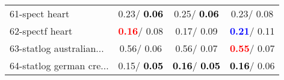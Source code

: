 \begin{table}[h]
\begin{center}
\begin{tabular}{lc|c|c}
61-spect heart &   0.23/\textcolor{black}{\textbf{  0.06}} &   0.25/\textcolor{black}{\textbf{  0.06}} &   0.23/  0.08 \\
62-spectf heart & \textcolor{red}{\textbf{  0.16}}/  0.08 &   0.17/  0.09 & \textcolor{blue}{\textbf{  0.21}}/  0.11 \\
63-statlog australian... &   0.56/  0.06 &   0.56/  0.07 & \textcolor{red}{\textbf{  0.55}}/  0.07 \\
64-statlog german cre... &   0.15/\textcolor{black}{\textbf{  0.05}} & \textcolor{black}{\textbf{  0.16}}/\textcolor{black}{\textbf{  0.05}} & \textcolor{black}{\textbf{  0.16}}/  0.06 \\\end{tabular}\label{stratsALCKappa1b5NNRedux}
\end{center}
\end{table}
